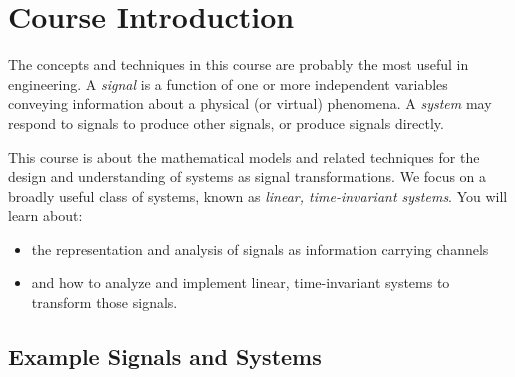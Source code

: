 \chapter{Course Introduction}

The concepts and techniques in this course are probably the most useful in engineering. A \textit{signal} is a function of one or more independent variables conveying information about a physical (or virtual) phenomena. A \textit{system} may respond to signals to produce other signals, or produce signals directly.

\begin{center}
\end{center}

This course is about the mathematical models and related techniques for the design and understanding of systems as signal transformations. We focus on a broadly useful class of systems, known as {\it linear, time-invariant systems}. You will learn about:

\begin{itemize}
\item the representation and analysis of signals as information carrying channels
\item and how to analyze and implement linear, time-invariant systems to transform those signals.
\end{itemize}

\section{Example Signals and Systems}

